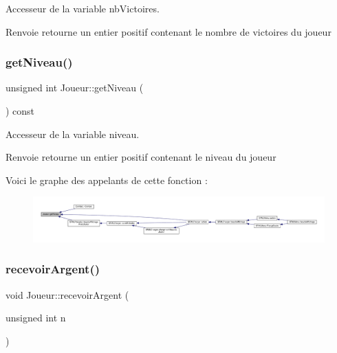 Accesseur de la variable nb\+Victoires. 

\begin{DoxyReturn}{Renvoie}
retourne un entier positif contenant le nombre de victoires du joueur 
\end{DoxyReturn}
\mbox{\label{class_joueur_abec464c3958916f951e19ba5e12d0dbc}} 
\subsubsection{\texorpdfstring{get\+Niveau()}{getNiveau()}}
{\footnotesize\ttfamily unsigned int Joueur\+::get\+Niveau (\begin{DoxyParamCaption}{ }\end{DoxyParamCaption}) const}



Accesseur de la variable niveau. 

\begin{DoxyReturn}{Renvoie}
retourne un entier positif contenant le niveau du joueur 
\end{DoxyReturn}
Voici le graphe des appelants de cette fonction \+:\nopagebreak
\begin{figure}[H]
\begin{center}
\leavevmode
\includegraphics[width=350pt]{class_joueur_abec464c3958916f951e19ba5e12d0dbc_icgraph}
\end{center}
\end{figure}
\mbox{\label{class_joueur_a816878a126e2e8a4610f782b4a06f53f}} 
\subsubsection{\texorpdfstring{recevoir\+Argent()}{recevoirArgent()}}
{\footnotesize\ttfamily void Joueur\+::recevoir\+Argent (\begin{DoxyParamCaption}\item[{unsigned int}]{n }\end{DoxyParamCaption})}



